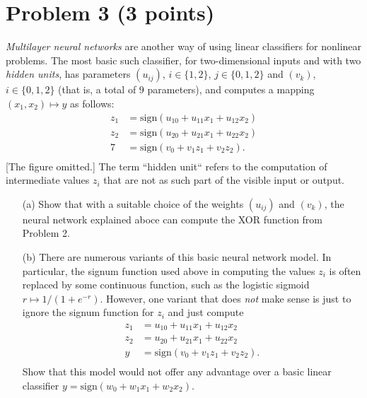 \documentclass[10pt]{article}
\begin{document}
\section*{Problem 3 (3 points)}
\color{blue}
\textit{Multilayer neural networks} are another way of using linear classifiers for nonlinear problems. The most basic such classifier, for two-dimensional inputs and with two \textit{hidden units}, has parameters $(u_{ij})$, $i \in \{ 1, 2 \}$, $j \in \{ 0, 1, 2 \}$ and $(v_k)$, $i \in \{ 0, 1, 2 \}$ (that is, a total of 9 parameters), and computes a mapping $(x_1, x_2) \mapsto y$ as follows:
\begin{align*}
z_1 &= \text{sign}(u_{10} + u_{11} x_1 + u_{12} x_2) \\
z_2 &= \text{sign}(u_{20} + u_{21} x_1 + u_{22} x_2) \\
7 &= \text{sign}(v_0 + v_1 z_1 + v_2 z_2). \\
\end{align*}
[The figure omitted.]
The term ``hidden unit`` refers to the computation of intermediate values $z_i$ that are not as such part of the visible input or output.
\begin{itemize}
\item[(a)] Show that with a suitable choice of the weights $(u_{ij})$ and $(v_k)$, the neural network explained aboce can compute the XOR function from Problem 2.
\item[(b)] There are numerous variants of this basic neural network model. In particular, the signum function used above in computing the values $z_i$ is often replaced by some continuous function, such as the logistic sigmoid $r \mapsto 1/(1 + e^{-r})$. However, one variant that does \textit{not} make sense is just to ignore the signum function for $z_i$ and just compute
\begin{align*}
z_1 &= u_{10} + u_{11} x_1 + u_{12} x_2 \\
z_2 &= u_{20} + u_{21} x_1 + u_{22} x_2 \\
y   &= \text{sign}(v_0 + v_1 z_1 + v_2 z_2). \\
\end{align*}
Show that this model would not offer any advantage over a basic linear classifier $y = \text{sign}(w_0 + w_1 x_1 + w_2 x_2).$
\end{itemize}
\color{black}
\end{document}
